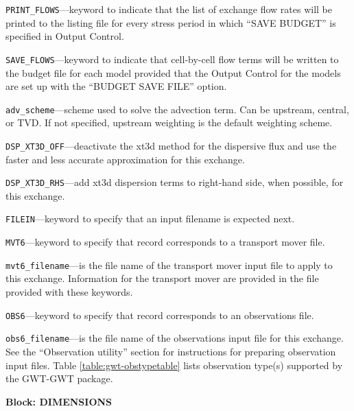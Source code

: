 \begin{description}
\item \texttt{PRINT\_FLOWS}---keyword to indicate that the list of exchange flow rates will be printed to the listing file for every stress period in which ``SAVE BUDGET'' is specified in Output Control.

\item \texttt{SAVE\_FLOWS}---keyword to indicate that cell-by-cell flow terms will be written to the budget file for each model provided that the Output Control for the models are set up with the ``BUDGET SAVE FILE'' option.

\item \texttt{adv\_scheme}---scheme used to solve the advection term.  Can be upstream, central, or TVD.  If not specified, upstream weighting is the default weighting scheme.

\item \texttt{DSP\_XT3D\_OFF}---deactivate the xt3d method for the dispersive flux and use the faster and less accurate approximation for this exchange.

\item \texttt{DSP\_XT3D\_RHS}---add xt3d dispersion terms to right-hand side, when possible, for this exchange.

\item \texttt{FILEIN}---keyword to specify that an input filename is expected next.

\item \texttt{MVT6}---keyword to specify that record corresponds to a transport mover file.

\item \texttt{mvt6\_filename}---is the file name of the transport mover input file to apply to this exchange.  Information for the transport mover are provided in the file provided with these keywords.

\item \texttt{OBS6}---keyword to specify that record corresponds to an observations file.

\item \texttt{obs6\_filename}---is the file name of the observations input file for this exchange. See the ``Observation utility'' section for instructions for preparing observation input files. Table \ref{table:gwt-obstypetable} lists observation type(s) supported by the GWT-GWT package.

\end{description}
\item \textbf{Block: DIMENSIONS}

